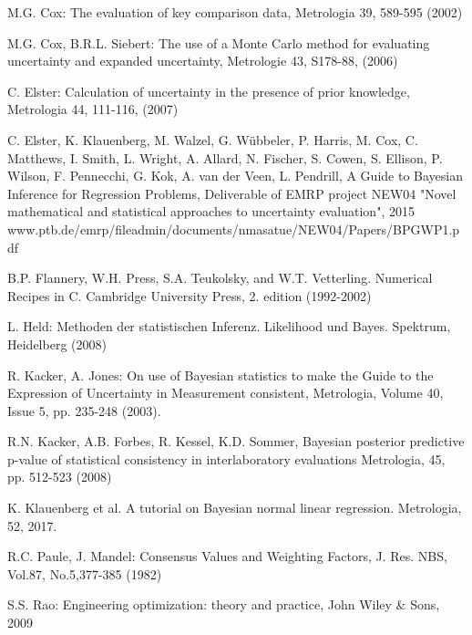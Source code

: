 \documentclass[a4paper,11pt]{book}
\begin{document}
\begin{flushleft}

\begin{thebibliography}{------}
     M.G. Cox: The evaluation of key comparison data, Metrologia 39, 589-595 (2002)

     M.G. Cox, B.R.L. Siebert: The use of
    a Monte Carlo method for evaluating uncertainty and expanded uncertainty, Metrologie 43, S178-88, (2006)

     C. Elster: Calculation of uncertainty in the presence of prior knowledge, Metrologia 44, 111-116, (2007)

     C. Elster, K. Klauenberg, M. Walzel, G. Wübbeler, P. Harris, M. Cox, C. Matthews, I. Smith, L. Wright, A. Allard, N. Fischer, S. Cowen, S. Ellison,
    P. Wilson, F. Pennecchi, G. Kok, A. van der Veen, L. Pendrill,
    A Guide to Bayesian Inference for Regression Problems, Deliverable of EMRP project NEW04 "Novel mathematical and statistical approaches to uncertainty evaluation", 2015 \newline
    www.ptb.de/emrp/fileadmin/documents/nmasatue/NEW04/Papers/BPGWP1.pdf

     B.P. Flannery, W.H. Press, S.A. Teukolsky, and W.T. Vetterling. Numerical Recipes in C. Cambridge University Press, 2. edition (1992-2002)

     L. Held: Methoden der statistischen Inferenz. Likelihood und Bayes. Spektrum, Heidelberg (2008)

     R. Kacker, A. Jones: On use of Bayesian statistics to make the Guide to the Expression of Uncertainty in Measurement consistent, Metrologia, Volume 40, Issue 5, pp. 235-248 (2003).

     R.N. Kacker, A.B. Forbes, R. Kessel, K.D. Sommer, Bayesian posterior predictive
    p-value of statistical consistency in interlaboratory evaluations Metrologia, 45, pp. 512-523 (2008)

     K. Klauenberg et al. A tutorial on Bayesian normal linear regression. Metrologia, 52, 2017.

      R.C. Paule, J. Mandel: Consensus Values and Weighting Factors, J. Res. NBS, Vol.87, No.5,377-385 (1982)

     S.S. Rao: Engineering optimization: theory and practice,
    John Wiley \& Sons, 2009


\end{thebibliography}
\end{flushleft}
\end{document}
